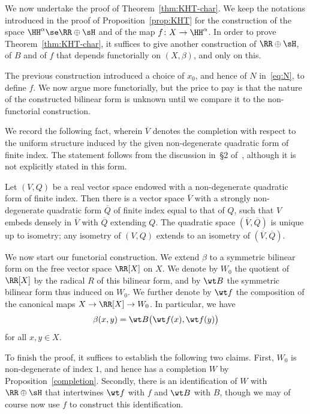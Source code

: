 We now undertake the proof of Theorem~\ref{thm:KHT-char}. We keep the notations introduced in the proof of Proposition~\ref{prop:KHT} for the construction of the space $\HH^\alpha\se \RR\oplus\sH$ and of the map $f\colon X\to \HH^\alpha$. In order to prove Theorem~\ref{thm:KHT-char}, it suffices to give another construction of $\RR\oplus\sH$, of $B$ and of $f$ that depends functorially on $(X, \beta)$, and only on this.

\begin{rema}
The previous construction introduced a choice of $x_0$, and hence of $N$ in~\eqref{eq:N}, to define $f$. We now argue more functorially, but the price to pay is that the nature of the constructed bilinear form is unknown until we compare it to the non-functorial construction.
\end{rema}

We record the following fact, wherein $\overline{V}$ denotes the completion with respect to the uniform structure induced by the given non-degenerate quadratic form of finite index. The statement follows from the discussion in~\S2 of~\cite{Burger-Iozzi-Monod}, although it is not explicitly stated in this form.

\begin{prop}\label{completion}
Let $(V,Q)$ be a real vector space endowed with a non-degenerate quadratic form of finite index. Then there is a vector space $\overline{V}$ with a strongly non-degenerate quadratic form $\overline{Q}$ of finite index equal to that of $Q$, such that $V$ embeds densely in $\overline{V}$ with $\overline{Q}$ extending $Q$. The quadratic space $(\overline{V},\overline{Q})$ is unique up to isometry; any isometry of $(V,Q)$ extends to an isometry of $(\overline{V},\overline{Q})$.
\end{prop}

We now start our functorial construction. We extend $\beta$ to a symmetric bilinear form on the free vector space $\RR[X]$ on $X$. We denote by $W_0$ the quotient of $\RR[X]$ by the radical $R$ of this bilinear form, and by $\wt B$ the symmetric bilinear form thus induced on $W_0$. We further denote by $\wt f$ the composition of the canonical maps $X\to \RR[X]\to W_0$. In particular, we have
\[
\beta(x,y) = \wt B\big(\wt f(x), \wt f(y)\big)
\]
for all $x,y\in X$.

To finish the proof, it suffices to establish the following two claims. First, $W_0$ is non-degenerate of index $1$, and hence has a completion $W$ by Proposition~\ref{completion}. Secondly, there is an identification of $W$ with $\RR\oplus\sH$ that intertwines $\wt f$ with $f$ and $\wt B$ with $B$, though we may of course now use $f$ to construct this identification.

